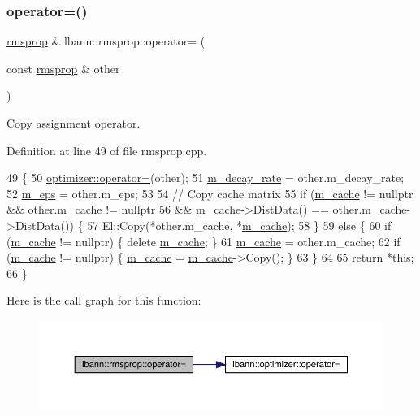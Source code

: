 \subsubsection{\texorpdfstring{operator=()}{operator=()}}
{\footnotesize\ttfamily \hyperlink{classlbann_1_1rmsprop}{rmsprop} \& lbann\+::rmsprop\+::operator= (\begin{DoxyParamCaption}\item[{const \hyperlink{classlbann_1_1rmsprop}{rmsprop} \&}]{other }\end{DoxyParamCaption})}

Copy assignment operator. 

Definition at line 49 of file rmsprop.\+cpp.


\begin{DoxyCode}
49                                                 \{
50   \hyperlink{classlbann_1_1optimizer_ab7811e0a4d2d9b594140aed78b6de743}{optimizer::operator=}(other);
51   \hyperlink{classlbann_1_1rmsprop_a9cd712c44e7c4995120e2933b0387d71}{m\_decay\_rate} = other.m\_decay\_rate;
52   \hyperlink{classlbann_1_1rmsprop_a6ea73caf5b2769451dfd798665877208}{m\_eps} = other.m\_eps;
53 
54   \textcolor{comment}{// Copy cache matrix}
55   \textcolor{keywordflow}{if} (\hyperlink{classlbann_1_1rmsprop_a2bbaa35bb209e971a5ac9e1dbb6ece76}{m\_cache} != \textcolor{keyword}{nullptr} && other.m\_cache != \textcolor{keyword}{nullptr}
56       && \hyperlink{classlbann_1_1rmsprop_a2bbaa35bb209e971a5ac9e1dbb6ece76}{m\_cache}->DistData() == other.m\_cache->DistData()) \{
57     El::Copy(*other.m\_cache, *\hyperlink{classlbann_1_1rmsprop_a2bbaa35bb209e971a5ac9e1dbb6ece76}{m\_cache});
58   \}
59   \textcolor{keywordflow}{else} \{
60     \textcolor{keywordflow}{if} (\hyperlink{classlbann_1_1rmsprop_a2bbaa35bb209e971a5ac9e1dbb6ece76}{m\_cache} != \textcolor{keyword}{nullptr}) \{ \textcolor{keyword}{delete} \hyperlink{classlbann_1_1rmsprop_a2bbaa35bb209e971a5ac9e1dbb6ece76}{m\_cache}; \}
61     \hyperlink{classlbann_1_1rmsprop_a2bbaa35bb209e971a5ac9e1dbb6ece76}{m\_cache} = other.m\_cache;
62     \textcolor{keywordflow}{if} (\hyperlink{classlbann_1_1rmsprop_a2bbaa35bb209e971a5ac9e1dbb6ece76}{m\_cache} != \textcolor{keyword}{nullptr}) \{ \hyperlink{classlbann_1_1rmsprop_a2bbaa35bb209e971a5ac9e1dbb6ece76}{m\_cache} = \hyperlink{classlbann_1_1rmsprop_a2bbaa35bb209e971a5ac9e1dbb6ece76}{m\_cache}->Copy(); \}
63   \}
64 
65   \textcolor{keywordflow}{return} *\textcolor{keyword}{this};
66 \}
\end{DoxyCode}
Here is the call graph for this function\+:\nopagebreak
\begin{figure}[H]
\begin{center}
\leavevmode
\includegraphics[width=350pt]{classlbann_1_1rmsprop_a3c7eb1fb105c7be762b97e4f947a2b94_cgraph}
\end{center}
\end{figure}
